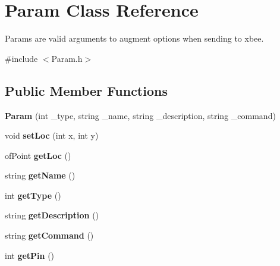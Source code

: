 \hypertarget{class_param}{
\section{Param Class Reference}
\label{class_param}
}


Params are valid arguments to augment options when sending to xbee.  




{\ttfamily \#include $<$Param.h$>$}

\subsection*{Public Member Functions}
\begin{DoxyCompactItemize}
\item 
\hypertarget{class_param_a567cadfc20ef79fe7537c2ab3f446ae1}{
{\bfseries Param} (int \_\-type, string \_\-name, string \_\-description, string \_\-command)}
\label{class_param_a567cadfc20ef79fe7537c2ab3f446ae1}

\item 
\hypertarget{class_param_aad0c8901ac5cd8d43d483db855c8cc9d}{
void {\bfseries setLoc} (int x, int y)}
\label{class_param_aad0c8901ac5cd8d43d483db855c8cc9d}

\item 
\hypertarget{class_param_a1e9ca56d41c536f128f3e4a2557baf0a}{
ofPoint {\bfseries getLoc} ()}
\label{class_param_a1e9ca56d41c536f128f3e4a2557baf0a}

\item 
\hypertarget{class_param_a3a2625245f334b8b3e4c8c986afd3ba1}{
string {\bfseries getName} ()}
\label{class_param_a3a2625245f334b8b3e4c8c986afd3ba1}

\item 
\hypertarget{class_param_af09bcc484cfd935ee3d6624fc6b9a9b1}{
int {\bfseries getType} ()}
\label{class_param_af09bcc484cfd935ee3d6624fc6b9a9b1}

\item 
\hypertarget{class_param_a7ac2fb94ab53482fc920bf827ef91dda}{
string {\bfseries getDescription} ()}
\label{class_param_a7ac2fb94ab53482fc920bf827ef91dda}

\item 
\hypertarget{class_param_a2cff0c7326d1269e6f3ee29468ed44e8}{
string {\bfseries getCommand} ()}
\label{class_param_a2cff0c7326d1269e6f3ee29468ed44e8}

\item 
\hypertarget{class_param_aa8226cbb25cf37d58d68f335a185c8a0}{
int {\bfseries getPin} ()}
\label{class_param_aa8226cbb25cf37d58d68f335a185c8a0}

\end{DoxyCompactItemize}


